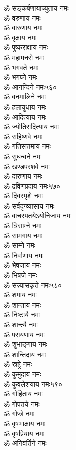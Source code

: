 \begin{center}
\begin{multicols}{2}
\begin{flushleft}
ॐ सङ्कर्षणायाच्युताय नमः\\
ॐ वरुणाय नमः\\
ॐ वारुणाय नमः\\
ॐ वृक्षाय नमः\\
ॐ पुष्कराक्षाय नमः\\
ॐ महामनसे नमः\\
ॐ भगवते नमः\\
ॐ भगघ्ने नमः\\
ॐ आनन्दिने नमः\hfill ५६०\\
ॐ वनमालिने नमः\\
ॐ हलायुधाय नमः\\
ॐ आदित्याय नमः\\
ॐ ज्योतिरादित्याय नमः\\
ॐ सहिष्णवे नमः\\
ॐ गतिसत्तमाय नमः\\
ॐ सुधन्वने नमः\\
ॐ खण्डपरशवे नमः\\
ॐ दारुणाय नमः\\
ॐ द्रविणप्रदाय नमः\hfill ५७०\\
ॐ दिवस्पृशे नमः\\
ॐ सर्वदृग्व्यासाय नमः\\
ॐ वाचस्पतयेऽयोनिजाय नमः\\
ॐ त्रिसाम्ने नमः\\
ॐ सामगाय नमः\\
ॐ साम्ने नमः\\
ॐ निर्वाणाय नमः\\
ॐ भेषजाय नमः\\
ॐ भिषजे नमः\\
ॐ सन्न्यासकृते नमः\hfill ५८०\\
ॐ शमाय नमः\\
ॐ शान्ताय नमः\\
ॐ निष्टायै नमः\\
ॐ शान्त्यै नमः\\
ॐ परायणाय नमः\\
ॐ शुभाङ्गाय नमः\\
ॐ शान्तिदाय नमः\\
ॐ स्रष्ट्रे नमः\\
ॐ कुमुदाय नमः\\
ॐ कुवलेशयाय नमः\hfill ५९०\\
ॐ गोहिताय नमः\\
ॐ गोपतये नमः\\
ॐ गोप्त्रे नमः\\
ॐ वृषभाक्षाय नमः\\
ॐ वृषप्रियाय नमः\\
ॐ अनिवर्तिने नमः\\

\end{flushleft}
\end{multicols}
\end{center}

